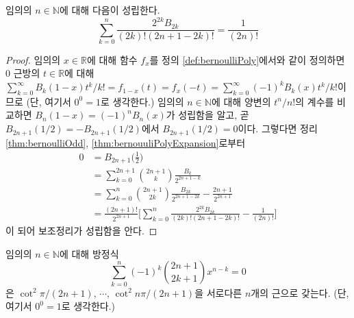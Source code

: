 \begin{lemma}\label{lem:bernoulliSum}
    임의의 $n\in\mathbb{N}$에 대해 다음이 성립한다.
    \begin{equation*}
        \sum_{k=0}^n\frac{2^{2k}B_{2k}}{(2k)!(2n+1-2k)!}=\frac{1}{(2n)!}
    \end{equation*}
\end{lemma}

\begin{proof}
    임의의 $x\in\mathbb{R}$에 대해 함수 $f_x$를 정의 \ref{def:bernoulliPoly}에서와 같이 정의하면 $0$ 근방의 $t\in\mathbb{R}$에 대해 $\sum_{k=0}^\infty B_k(1-x)t^k/k!=f_{1-x}(t)=f_x(-t)=\sum_{k=0}^\infty(-1)^kB_k(x)t^k/k!$이므로 (단, 여기서 $0^0=1$로 생각한다.) 임의의 $n\in\mathbb{N}$에 대해 양변의 $t^n/n!$의 계수를 비교하면 $B_n(1-x)=(-1)^nB_n(x)$가 성립함을 알고, 곧 $B_{2n+1}(1/2)=-B_{2n+1}(1/2)$에서 $B_{2n+1}(1/2)=0$이다. 그렇다면 정리 \ref{thm:bernoulliOdd}, \ref{thm:bernouuliPolyExpansion}로부터 
    \begin{align*}
        0&=B_{2n+1}\bigg(\frac{1}{2}\bigg)\\
        &=\sum_{k=0}^{2n+1}\binom{2n+1}{k}\frac{B_k}{2^{2n+1-k}}\\
        &=\sum_{k=0}^n\binom{2n+1}{2k}\frac{B_{2k}}{2^{2n+1-2k}}-\frac{2n+1}{2^{2n+1}}\\
        &=\frac{(2n+1)!}{2^{2n+1}}\bigg[\sum_{k=0}^n\frac{2^{2k}B_{2k}}{(2k)!(2n+1-2k)!}-\frac{1}{(2n)!}\bigg]
    \end{align*}
    이 되어 보조정리가 성립함을 안다.
\end{proof}

\begin{lemma}[Papadimitriou]
    임의의 $n\in\mathbb{N}$에 대해 방정식
    \begin{equation*}
        \sum_{k=0}^n(-1)^k\binom{2n+1}{2k+1}x^{n-k}=0
    \end{equation*}
    은 $\cot^2\pi/(2n+1),\,\cdots,\,\cot^2n\pi/(2n+1)$을 서로다른 $n$개의 근으로 갖는다. (단, 여기서 $0^0=1$로 생각한다.)
\end{lemma}

